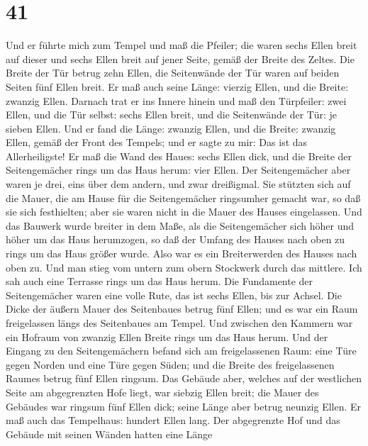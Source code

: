 \hypertarget{section-40}{%
\section{41}\label{section-40}}

 Und er führte mich zum Tempel und maß die Pfeiler; die
waren sechs Ellen breit auf dieser und sechs Ellen breit auf jener
Seite, gemäß der Breite des Zeltes.  Die Breite der Tür
betrug zehn Ellen, die Seitenwände der Tür waren auf beiden Seiten fünf
Ellen breit. Er maß auch seine Länge: vierzig Ellen, und die Breite:
zwanzig Ellen.  Darnach trat er ins Innere hinein und maß
den Türpfeiler: zwei Ellen, und die Tür selbst: sechs Ellen breit, und
die Seitenwände der Tür: je sieben Ellen.  Und er fand die
Länge: zwanzig Ellen, und die Breite: zwanzig Ellen, gemäß der Front des
Tempels; und er sagte zu mir: Das ist das Allerheiligste! 
Er maß die Wand des Haues: sechs Ellen dick, und die Breite der
Seitengemächer rings um das Haus herum: vier Ellen.  Der
Seitengemächer aber waren je drei, eins über dem andern, und zwar
dreißigmal. Sie stützten sich auf die Mauer, die am Hause für die
Seitengemächer ringsumher gemacht war, so daß sie sich festhielten; aber
sie waren nicht in die Mauer des Hauses eingelassen.  Und
das Bauwerk wurde breiter in dem Maße, als die Seitengemächer sich höher
und höher um das Haus herumzogen, so daß der Umfang des Hauses nach oben
zu rings um das Haus größer wurde. Also war es ein Breiterwerden des
Hauses nach oben zu. Und man stieg vom untern zum obern Stockwerk durch
das mittlere.  Ich sah auch eine Terrasse rings um das
Haus herum. Die Fundamente der Seitengemächer waren eine volle Rute, das
ist sechs Ellen, bis zur Achsel.  Die Dicke der äußern
Mauer des Seitenbaues betrug fünf Ellen; und es war ein Raum
freigelassen längs des Seitenbaues am Tempel.  Und
zwischen den Kammern war ein Hofraum von zwanzig Ellen Breite rings um
das Haus herum.  Und der Eingang zu den Seitengemächern
befand sich am freigelassenen Raum: eine Türe gegen Norden und eine Türe
gegen Süden; und die Breite des freigelassenen Raumes betrug fünf Ellen
ringsum.  Das Gebäude aber, welches auf der westlichen
Seite am abgegrenzten Hofe liegt, war siebzig Ellen breit; die Mauer des
Gebäudes war ringsum fünf Ellen dick; seine Länge aber betrug neunzig
Ellen.  Er maß auch das Tempelhaus: hundert Ellen lang.
Der abgegrenzte Hof und das Gebäude mit seinen Wänden hatten eine Länge
